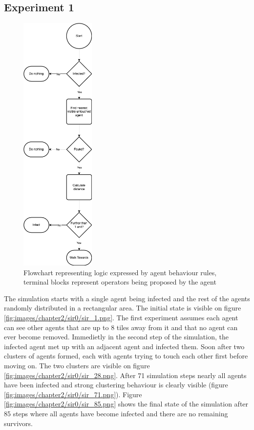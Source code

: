 \subsection{Experiment 1}

\begin{figure}[H]
    \centering
    \includegraphics[width=0.33\textwidth]{images/chapter2/sir_logic.drawio.png}
    \caption{Flowchart representing logic expressed by agent behaviour rules, terminal blocks represent operators being proposed by the agent}\label{fig:sir_logic.drawio.png}
\end{figure}

The simulation starts with a single agent being infected and the rest of the agents randomly distributed in a rectangular area.
The initial state is visible on figure \ref{fig:images/chapter2/sir0/sir_1.png}.
The first experiment assumes each agent can see other agents that are up to 8 tiles away from it and that no agent can ever become removed.
Immedietly in the second step of the simulation, the infected agent met up with an adjacent agent and infected them.
Soon after two clusters of agents formed, each with agents trying to touch each other first before moving on.
The two clusters are visible on figure \ref{fig:images/chapter2/sir0/sir_28.png}.
After 71 simulation steps nearly all agents have been infected and strong clustering behaviour is clearly visible (figure \ref{fig:images/chapter2/sir0/sir_71.png}).
Figure \ref{fig:images/chapter2/sir0/sir_85.png} shows the final state of the simulation after 85 steps where all agents have become infected and there are no remaining survivors.

